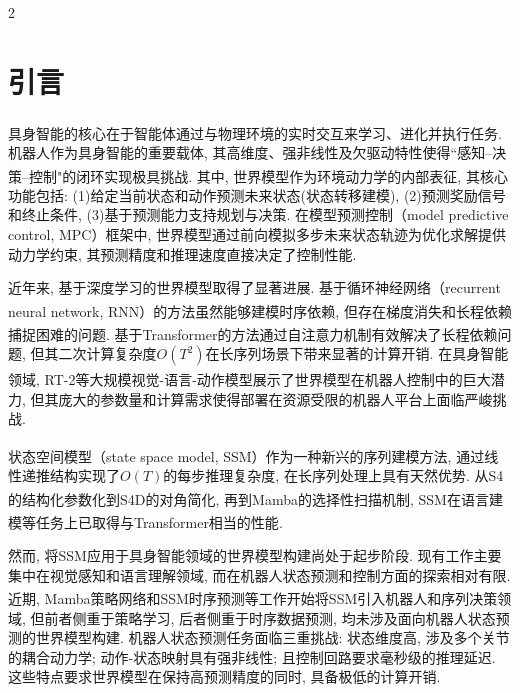 \renewcommand\refname{\normalsize{{\CJKfamily{hei}参考文献}}}
\setlength{\oddsidemargin}{-.5cm}
 \setlength{\textwidth}{171mm}
\vspace{10pt}
\enlargethispage{-10mm}
\begin{multicols}{2}
\fontsize{10.5bp}{12.9bp}\selectfont

\section{引言}

具身智能的核心在于智能体通过与物理环境的实时交互来学习、进化并执行任务\textsuperscript{\cite{1}}.
机器人作为具身智能的重要载体, 其高维度、强非线性及欠驱动特性使得``感知--决策--控制"的闭环实现极具挑战.
其中, 世界模型\textsuperscript{\cite{2}}作为环境动力学的内部表征, 其核心功能包括:
(1)给定当前状态和动作预测未来状态(状态转移建模),
(2)预测奖励信号和终止条件,
(3)基于预测能力支持规划与决策.
在模型预测控制（model predictive control, MPC）框架中,
世界模型通过前向模拟多步未来状态轨迹为优化求解提供动力学约束,
其预测精度和推理速度直接决定了控制性能.

近年来, 基于深度学习的世界模型取得了显著进展.
基于循环神经网络（recurrent neural network, RNN）的方法\textsuperscript{\cite{3}}虽然能够建模时序依赖, 但存在梯度消失和长程依赖捕捉困难的问题.
基于Transformer的方法\textsuperscript{\cite{4}}通过自注意力机制有效解决了长程依赖问题,
但其二次计算复杂度$O(T^2)$在长序列场景下带来显著的计算开销.
在具身智能领域, RT-2\textsuperscript{\cite{5}}等大规模视觉-语言-动作模型展示了世界模型在机器人控制中的巨大潜力,
但其庞大的参数量和计算需求使得部署在资源受限的机器人平台上面临严峻挑战.

状态空间模型（state space model, SSM）\textsuperscript{\cite{6}}作为一种新兴的序列建模方法,
通过线性递推结构实现了$O(T)$的每步推理复杂度, 在长序列处理上具有天然优势.
从S4的结构化参数化到S4D\textsuperscript{\cite{7}}的对角简化,
再到Mamba\textsuperscript{\cite{8}}的选择性扫描机制, SSM在语言建模等任务上已取得与Transformer相当的性能\textsuperscript{\cite{9}}.

然而, 将SSM应用于具身智能领域的世界模型构建尚处于起步阶段.
现有工作主要集中在视觉感知和语言理解领域,
而在机器人状态预测和控制方面的探索相对有限.
近期, Mamba策略网络\textsuperscript{\cite{20,21}}和SSM时序预测\textsuperscript{\cite{22}}等工作开始将SSM引入机器人和序列决策领域,
但前者侧重于策略学习, 后者侧重于时序数据预测,
均未涉及面向机器人状态预测的世界模型构建.
机器人状态预测任务面临三重挑战: 状态维度高, 涉及多个关节的耦合动力学; 动作-状态映射具有强非线性; 且控制回路要求毫秒级的推理延迟.
这些特点要求世界模型在保持高预测精度的同时, 具备极低的计算开销.


\end{multicols}
